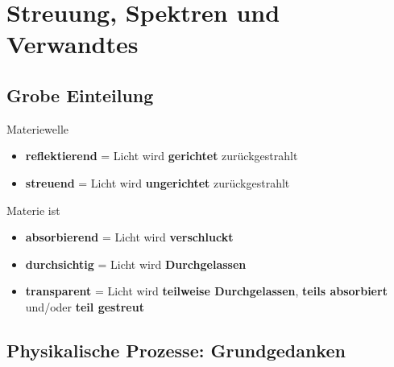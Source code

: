 \documentclass[titlepage,11pt,a4paper,ngerman]{report}
\begin{document}
\section{Streuung, Spektren und Verwandtes}

\subsection{Grobe Einteilung}

Materiewelle
\begin{itemize}
	\item \textbf{reflektierend} = Licht wird \textbf{gerichtet} zurückgestrahlt
	\item \textbf{streuend} = Licht wird \textbf{ungerichtet} zurückgestrahlt
\end{itemize}
Materie ist
\begin{itemize}
	\item \textbf{absorbierend} = Licht wird \textbf{verschluckt}
	\item \textbf{durchsichtig} = Licht wird \textbf{Durchgelassen}
	\item \textbf{transparent} = Licht wird \textbf{teilweise Durchgelassen}, \textbf{teils absorbiert} und/oder \textbf{teil gestreut}
\end{itemize}

\subsection{Physikalische Prozesse: Grundgedanken}
\end{document}
